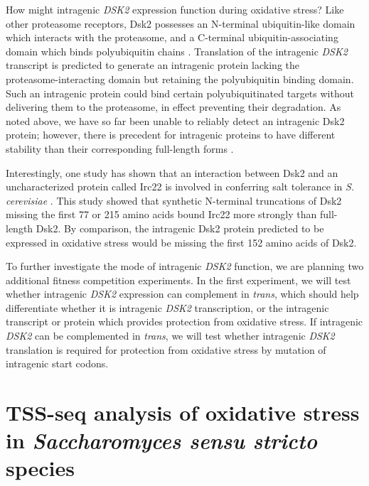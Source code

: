 How might intragenic \textit{DSK2} expression function during oxidative stress?
Like other proteasome receptors, Dsk2 possesses an N-terminal ubiquitin-like domain which interacts with the proteasome, and a C-terminal ubiquitin-associating domain which binds polyubiquitin chains \citep{funakoshi2002}.
Translation of the intragenic \textit{DSK2} transcript is predicted to generate an intragenic protein lacking the\\ proteasome-interacting domain but retaining the polyubiquitin binding domain.
Such an intragenic protein could bind certain polyubiquitinated targets without delivering them to the proteasome, in effect preventing their degradation.
As noted above, we have so far been unable to reliably detect an intragenic Dsk2 protein; however, there is precedent for intragenic proteins to have different stability than their corresponding full-length forms \citep{gammie1999, benanti2009}.

Interestingly, one study has shown that an interaction between Dsk2 and an uncharacterized protein called Irc22 is involved in conferring salt tolerance in \textit{S. cerevisiae} \citep{ishii2014}.
This study showed that synthetic N-terminal truncations of Dsk2 missing the first 77 or 215 amino acids bound Irc22 more strongly than full-length Dsk2.
By comparison, the intragenic Dsk2 protein predicted to be expressed in oxidative stress would be missing the first 152 amino acids of Dsk2.

To further investigate the mode of intragenic \textit{DSK2} function, we are planning two additional fitness competition experiments.
In the first experiment, we will test whether intragenic \textit{DSK2} expression can complement in \textit{trans}, which should help differentiate whether it is intragenic \textit{DSK2} transcription, or the intragenic transcript or protein which provides protection from oxidative stress.
If intragenic \textit{DSK2} can be complemented in \textit{trans}, we will test whether intragenic \textit{DSK2} translation is required for protection from oxidative stress by mutation of intragenic start codons.

\section[TSS-seq analysis of oxidative stress\\ in \textit{Saccharomyces sensu stricto} species]{TSS-seq analysis of oxidative stress in \textit{Saccharomyces sensu stricto} species}

